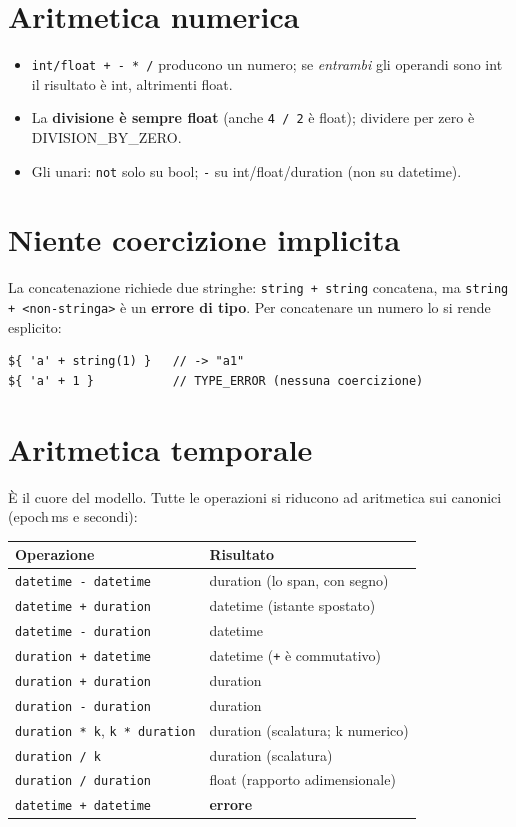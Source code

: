 \documentclass[11pt,a4paper]{book}
\let\code\lstinline
\newcommand{\ic}[1]{{\ttfamily #1}}
\theoremstyle{definition}
\begin{document}
{{{{\section{Aritmetica numerica}

\begin{itemize}
  \item \code|int/float + - * /| producono un numero; se \emph{entrambi} gli
    operandi sono \ic{int} il risultato è \ic{int}, altrimenti \ic{float}.
  \item La \textbf{divisione è sempre \ic{float}} (anche \code|4 / 2| è
    \ic{float}); dividere per zero è \ic{DIVISION\_BY\_ZERO}.
  \item Gli unari: \code|not| solo su bool; \code|-| su int/float/duration (non su
    datetime).
\end{itemize}

\section{Niente coercizione implicita}

La concatenazione richiede due stringhe: \code|string + string| concatena, ma
\code|string + <non-stringa>| è un \textbf{errore di tipo}. Per concatenare un
numero lo si rende esplicito:

\begin{lstlisting}
${ 'a' + string(1) }   // -> "a1"
${ 'a' + 1 }           // TYPE_ERROR (nessuna coercizione)
\end{lstlisting}

\section{Aritmetica temporale}

È il cuore del modello. Tutte le operazioni si riducono ad aritmetica sui
canonici (epoch\,ms e secondi):

\begin{center}
\small
\begin{tabular}{@{}l l@{}}
\toprule
\textbf{Operazione} & \textbf{Risultato} \\
\midrule
\code|datetime - datetime| & \ic{duration} (lo span, con segno) \\
\code|datetime + duration| & \ic{datetime} (istante spostato) \\
\code|datetime - duration| & \ic{datetime} \\
\code|duration + datetime| & \ic{datetime} (\code|+| è commutativo) \\
\code|duration + duration| & \ic{duration} \\
\code|duration - duration| & \ic{duration} \\
\code|duration * k|, \code|k * duration| & \ic{duration} (scalatura; \ic{k} numerico) \\
\code|duration / k| & \ic{duration} (scalatura) \\
\code|duration / duration| & \ic{float} (rapporto adimensionale) \\
\code|datetime + datetime| & \textbf{errore} \\
\bottomrule
\end{tabular}
\end{center}

}}}}
\end{document}
